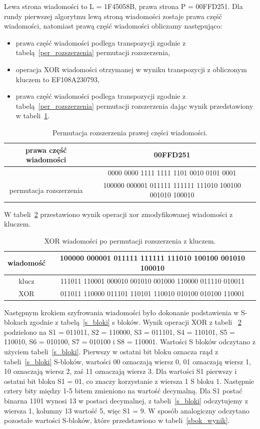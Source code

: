 \documentclass[12p]{article}
\begin{document}
Lewa strona wiadomości to L = 1F45058B, prawa strona P = 00FFD251. 
Dla rundy pierwszej algorytmu lewą stroną wiadomości zostaje prawa część wiadomości, natomiast prawą część wiadomości obliczamy następująco:
\begin{itemize}
\item prawa część wiadomości podlega transpozycji zgodnie z tabelą~\ref{per_rozszerzenia} permutacji rozszerzenia,
\item operacja XOR wiadomości otrzymanej w wyniku transpozycji z obliczonym kluczem to EF108A230793,
\item prawa część wiadomości podlega transpozycji zgodnie z tabelą~\ref{per_rozszerzenia} permutacji rozszerzenia dając wynik przedstawiony w tabeli~\ref{per_rozszerzenia_wiadomosci}.
\end{itemize}

\begin{table}[H]
\centering
\begin{tabular}{|c|c|}
\hline
prawa część wiadomości & 00FFD251\\ \hline
& 0000 0000 1111 1111 1101 0010 0101 0001\\ \hline
permutacja rozszerzenia & 100000 000001 011111 111111 111010 100100 001010 100010\\ \hline
\end{tabular}
\caption{Permutacja rozszerzenia prawej części wiadomości.}\label{per_rozszerzenia_wiadomosci}
\end{table}

W tabeli~\ref{xor} przestawiono wynik operacji xor zmodyfikowanej wiadomości z kluczem.

\begin{table}[H]
\centering
\begin{tabular}{|c|c|}
\hline
wiadomość & 100000 000001 011111 111111 111010 100100 001010 100010\\ \hline
klucz & 111011 110001 000010 001010 001000 110000 011110 010011\\ \hline
XOR & 011011 110000 011101 110101 110010 010100 010100 110001\\ 
\hline
\end{tabular}
\caption{XOR wiadomości po permutacji rozszerzenia z kluczem.}\label{xor}
\end{table}

Następnym krokiem szyfrowania wiadomości było dokonanie podstawienia w S-blokach zgodnie z tabelą~\ref{s_bloki} s bloków. Wynik operacji XOR z tabeli ~\ref{xor} podzielono na S1 = 011011, S2 = 110000, S3 = 011101, S4 = 110101, S5 = 110010, S6 = 010100, S7 = 010100 i S8 = 110001. Wartości S bloków odczytano z użyciem tabeli~\ref{s_bloki}. Pierwszy w ostatni bit bloku oznacza rząd z tabeli~\ref{s_bloki} S-bloków, wartości 00 oznaczają wiersz 0, 01 oznaczają wiersz 1, 10 oznaczają wiersz 2, zaś 11 oznaczają wiersz 3. Dla wartości S1 pierwszy i ostatni bit bloku S1 = 01, co znaczy korzystanie z wiersza 1 S bloku 1. Następnie cztery bity między 1-5 bitem zmieniono na wartość decymalną. Dla S1 postać binarna 1101 wynosi 13 w postaci decymalnej, z tabeli~\ref{s_bloki} odczytujemy z wiersza 1, kolumny 13 wartość  5, więc S1 = 9. W sposób analogiczny odczytano pozostałe wartości S-bloków, które przedstawiono w tabeli~\ref{sbok_wynik}.
 
\end{document}
